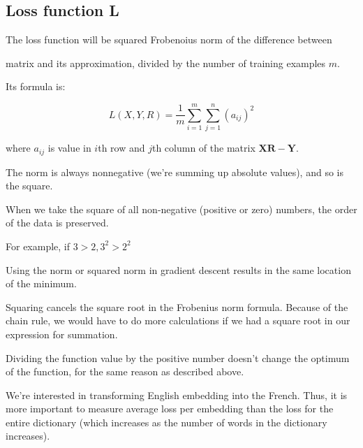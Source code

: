 \documentclass[4apaper,12pt]{book}
\begin{document}
\subsection {Loss function L}
\begin{description}
\item The loss function will be squared Frobenoius norm of the difference between
\item matrix and its approximation, divided by the number of training examples $m$.
\item  Its formula is:
\item $$ L(X, Y, R)=\frac{1}{m}\sum_{i=1}^{m} \sum_{j=1}^{n}\left( a_{i j} \right)^{2}$$

\item where $a_{i j}$ is value in $i$th row and $j$th column of the matrix $\mathbf{XR}-\mathbf{Y}$.

\item The norm is always nonnegative (we're summing up absolute values), and so is the square.
\item When we take the square of all non-negative (positive or zero) numbers, the order of the data is preserved.
\item For example, if $3 > 2, 3^2 > 2^2$
\item Using the norm or squared norm in gradient descent results in the same location of the minimum.
\item  Squaring cancels the square root in the Frobenius norm formula. Because of the chain rule, we would have to do more calculations if we had a square root in our expression for summation.
\item Dividing the function value by the positive number doesn't change the optimum of the function, for the same reason as described above.
\item We're interested in transforming English embedding into the French. Thus, it is more important to measure average loss per embedding than the loss for the entire dictionary (which increases as the number of words in the dictionary increases).
\end{description}
\end{document}
